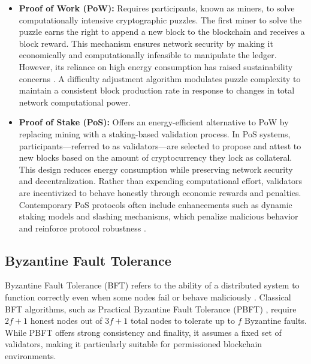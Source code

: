 \documentclass[final]{rc-book-2.14}
\begin{document}
\begin{itemize}

    \item \textbf{Proof of Work (PoW):} Requires participants, known as miners, to solve computationally intensive cryptographic puzzles. The first miner to solve the puzzle earns the right to append a new block to the blockchain and receives a block reward. This mechanism ensures network security by making it economically and computationally infeasible to manipulate the ledger. However, its reliance on high energy consumption has raised sustainability concerns \cite{narayanan2016bitcoin, sedlmeir_energy_2020}. A difficulty adjustment algorithm modulates puzzle complexity to maintain a consistent block production rate in response to changes in total network computational power.

    \item \textbf{Proof of Stake (PoS):} Offers an energy-efficient alternative to PoW by replacing mining with a staking-based validation process. In PoS systems, participants—referred to as validators—are selected to propose and attest to new blocks based on the amount of cryptocurrency they lock as collateral. This design reduces energy consumption while preserving network security and decentralization. Rather than expending computational effort, validators are incentivized to behave honestly through economic rewards and penalties. Contemporary PoS protocols often include enhancements such as dynamic staking models and slashing mechanisms, which penalize malicious behavior and reinforce protocol robustness \cite{kiayias2017}.

\end{itemize}


\subsection{Byzantine Fault Tolerance}

Byzantine Fault Tolerance (BFT) refers to the ability of a distributed system to function correctly even when some nodes fail or behave maliciously \cite{lamport1982byzantine}. Classical BFT algorithms, such as Practical Byzantine Fault Tolerance (PBFT) \cite{castro1999practical}, require \(2f+1\) honest nodes out of \(3f+1\) total nodes to tolerate up to \(f\) Byzantine faults. While PBFT offers strong consistency and finality, it assumes a fixed set of validators, making it particularly suitable for permissioned blockchain environments.
\end{document}
